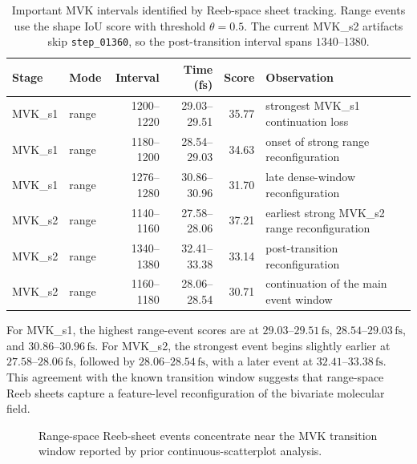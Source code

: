 \begin{table}[t]
  \centering
  \caption{Important MVK intervals identified by Reeb-space sheet tracking.
  Range events use the shape IoU score with threshold \(\theta=0.5\). The
  current MVK\_s2 artifacts skip \texttt{step\_01360}, so the post-transition
  interval spans \(1340\)--\(1380\).}
  \label{tab:mvk-events}
  \begin{tabular}{llrrrl}
    \toprule
    Stage & Mode & Interval & Time (fs) & Score & Observation \\
    \midrule
    MVK\_s1 & range & 1200--1220 & 29.03--29.51 & 35.77 &
    strongest MVK\_s1 continuation loss \\
    MVK\_s1 & range & 1180--1200 & 28.54--29.03 & 34.63 &
    onset of strong range reconfiguration \\
    MVK\_s1 & range & 1276--1280 & 30.86--30.96 & 31.70 &
    late dense-window reconfiguration \\
    MVK\_s2 & range & 1140--1160 & 27.58--28.06 & 37.21 &
    earliest strong MVK\_s2 range reconfiguration \\
    MVK\_s2 & range & 1340--1380 & 32.41--33.38 & 33.14 &
    post-transition reconfiguration \\
    MVK\_s2 & range & 1160--1180 & 28.06--28.54 & 30.71 &
    continuation of the main event window \\
    \bottomrule
  \end{tabular}
\end{table}

For MVK\_s1, the highest range-event scores are at
\(29.03\)--\(29.51\,\mathrm{fs}\), \(28.54\)--\(29.03\,\mathrm{fs}\), and
\(30.86\)--\(30.96\,\mathrm{fs}\). For MVK\_s2, the strongest event begins
slightly earlier at \(27.58\)--\(28.06\,\mathrm{fs}\), followed by
\(28.06\)--\(28.54\,\mathrm{fs}\), with a later event at
\(32.41\)--\(33.38\,\mathrm{fs}\). This agreement with the known transition
window suggests that range-space Reeb sheets capture a feature-level
reconfiguration of the bivariate molecular field.

\begin{figure}[t]
  \centering
  \caption{Range-space Reeb-sheet events concentrate near the MVK transition
  window reported by prior continuous-scatterplot analysis.}
  \label{fig:mvk-range-events}
\end{figure}

